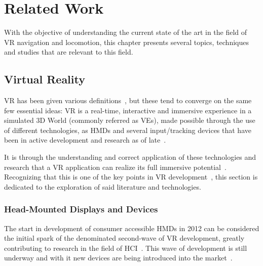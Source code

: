 
%
\glsresetall


\chapter{Related Work}
\label{cha:related_work}

With the objective of understanding the current state of the art in the field of \gls{VR} 
navigation and locomotion, this chapter presents several topics, techniques and studies that are relevant to this field.

\section{Virtual Reality}
\label{sec:vr-background}

\gls{VR} has been given various definitions~\cite{Mazuryk1999}, but these tend to converge on the same few essential ideas: \gls{VR} is a real-time,
interactive and immersive experience in a simulated 3D World (commonly referred as \glspl{VE}), made possible through the use of different technologies, 
as \glspl{HMD} and several input/tracking devices that have been in active development and research as of late~\cite{Boletsis2022}.

It is through the understanding and correct application of these technologies and research that a \gls{VR} application can realize its full 
immersive potential~\cite{Lee2020}. Recognizing that this is one of the key points in \gls{VR} development~\cite{Schwind2019}, 
this section is dedicated to the exploration of said literature and technologies.

\subsection{Head-Mounted Displays and Devices}
\label{sec:hmds-devices}

The start in development of consumer accessible \glspl{HMD} in 2012 can be considered the initial spark of the denominated second-wave of \gls{VR} 
development, greatly contributing to research in the field of \gls{HCI}~\cite{Anthes2016}. This wave of development is still underway and with it 
new devices are being introduced into the market~\cite{Lee2020}.

